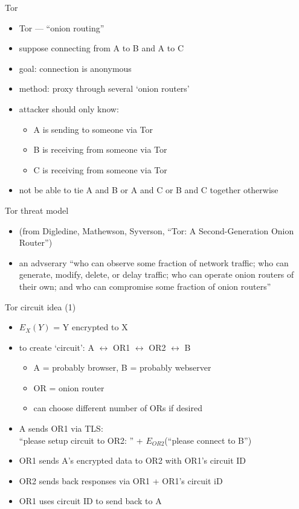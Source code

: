 \begin{frame}{Tor}
    \begin{itemize}
    \item Tor --- ``onion routing''
    \item suppose connecting from A to B and A to C
    \item goal: connection is anonymous
    \item method: proxy through several `onion routers'
    \vspace{.5cm}
    \item attacker should only know:
        \begin{itemize}
        \item A is sending to someone via Tor
        \item B is receiving from someone via Tor
        \item C is receiving from someone via Tor
        \end{itemize}
    \item not be able to tie A and B or A and C or B and C together otherwise
    \end{itemize}
\end{frame}

\begin{frame}{Tor threat model}
    \begin{itemize}
    \item (from Digledine, Mathewson, Syverson, ``Tor: A Second-Generation Onion Router'')
    \item an advserary ``who can observe some fraction of network traffic; who can generate, modify,
        delete, or delay traffic; who can operate onion routers of their own; and who can compromise some
        fraction of onion routers''
    \end{itemize}
\end{frame}

\begin{frame}{Tor circuit idea (1)}
    \begin{itemize}
    \item $E_X(Y)$ = Y encrypted to X
    \item to create `circuit': A $\leftrightarrow$ OR1 $\leftrightarrow$ OR2 $\leftrightarrow$ B
        \begin{itemize}
        \item A = probably browser, B = probably webserver
        \item OR = onion router
        \item can choose different number of ORs if desired
        \end{itemize}
    \item A sends OR1 via TLS: \\
        ``please setup circuit to OR2: '' + $E_{OR2}$(``please connect to B'')
    \item OR1 sends A's encrypted data to OR2 with OR1's circuit ID
    \item OR2 sends back responses via OR1 + OR1's circuit iD
    \item OR1 uses circuit ID to send back to A
    \end{itemize}
\end{frame}

